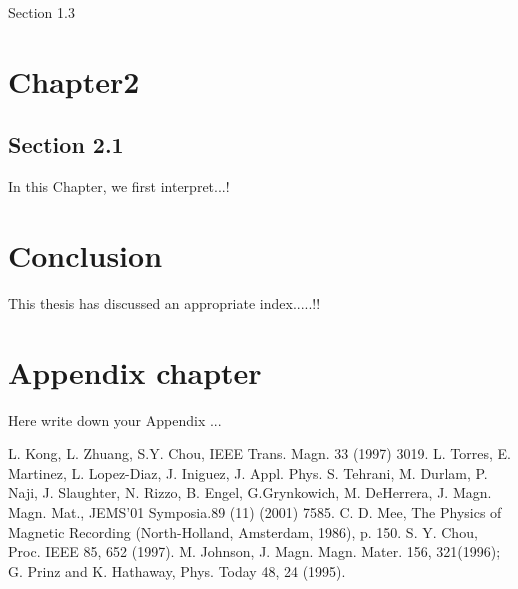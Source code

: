 \documentclass[12pt,a4]{report}
\begin{document}
Section 1.3


\chapter{Chapter2}

\section{Section 2.1}

In this Chapter, we first interpret...!



\chapter{Conclusion}

This thesis has discussed an appropriate index.....!!


\newpage
{}
\appendix


\chapter{Appendix chapter}

Here write down your Appendix ...


\newpage
%

%

\begin{thebibliography}{99}
 L. Kong, L. Zhuang, S.Y. Chou, IEEE Trans. Magn. 33
(1997) 3019.
 L. Torres, E. Martinez, L. Lopez-Diaz, J. Iniguez,
J. Appl. Phys.
 S. Tehrani, M. Durlam, P. Naji, J. Slaughter, N.
Rizzo, B. Engel, G.Grynkowich, M. DeHerrera, J. Magn. Magn. Mat.,
JEMS'01 Symposia.89 (11) (2001) 7585.
 C. D. Mee, The Physics of Magnetic Recording
(North-Holland, Amsterdam, 1986), p. 150.
 S. Y. Chou, Proc. IEEE 85, 652 (1997).
 M. Johnson, J. Magn. Magn. Mater. 156, 321(1996); G. Prinz and K.
Hathaway, Phys. Today 48, 24 (1995).
\end{thebibliography}
\end{document}
